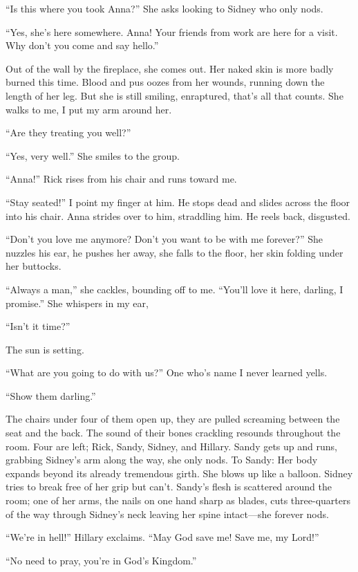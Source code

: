 \documentclass[
]{article}
\begin{document}
``Is this where you took Anna?'' She asks looking to Sidney who only
nods.

``Yes, she's here somewhere. Anna! Your friends from work are here for a
visit. Why don't you come and say hello.''

Out of the wall by the fireplace, she comes out. Her naked skin is more
badly burned this time. Blood and pus oozes from her wounds, running
down the length of her leg. But she is still smiling, enraptured, that's
all that counts. She walks to me, I put my arm around her.

``Are they treating you well?''

``Yes, very well.'' She smiles to the group.

``Anna!'' Rick rises from his chair and runs toward me.

``Stay seated!'' I point my finger at him. He stops dead and slides
across the floor into his chair. Anna strides over to him, straddling
him. He reels back, disgusted.

``Don't you love me anymore? Don't you want to be with me forever?'' She
nuzzles his ear, he pushes her away, she falls to the floor, her skin
folding under her buttocks.

``Always a man,'' she cackles, bounding off to me. ``You'll love it
here, darling, I promise.'' She whispers in my ear,

``Isn't it time?''

The sun is setting.

``What are you going to do with us?'' One who's name I never learned
yells.

``Show them darling.''

The chairs under four of them open up, they are pulled screaming between
the seat and the back. The sound of their bones crackling resounds
throughout the room. Four are left; Rick, Sandy, Sidney, and Hillary.
Sandy gets up and runs, grabbing Sidney's arm along the way, she only
nods. To Sandy: Her body expands beyond its already tremendous girth.
She blows up like a balloon. Sidney tries to break free of her grip but
can't. Sandy's flesh is scattered around the room; one of her arms, the
nails on one hand sharp as blades, cuts three-quarters of the way
through Sidney's neck leaving her spine intact---she forever nods.

``We're in hell!'' Hillary exclaims. ``May God save me! Save me, my
Lord!''

``No need to pray, you're in God's Kingdom.''
\end{document}
